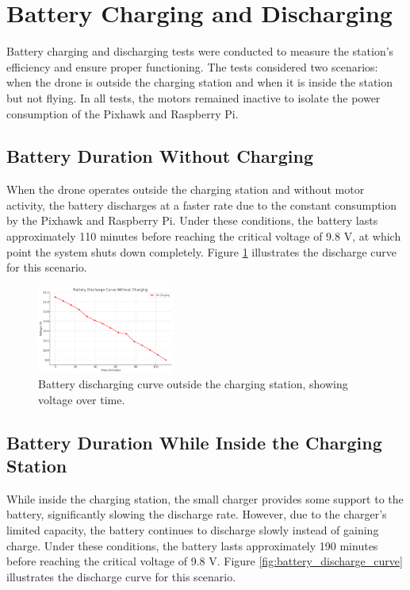 \section{Battery Charging and Discharging}

Battery charging and discharging tests were conducted to measure the station's efficiency and ensure proper functioning. The tests considered two scenarios: when the drone is outside the charging station and when it is inside the station but not flying. In all tests, the motors remained inactive to isolate the power consumption of the Pixhawk and Raspberry Pi.

\subsection{Battery Duration Without Charging}

When the drone operates outside the charging station and without motor activity, the battery discharges at a faster rate due to the constant consumption by the Pixhawk and Raspberry Pi. Under these conditions, the battery lasts approximately 110 minutes before reaching the critical voltage of 9.8 V, at which point the system shuts down completely. Figure \ref{fig:battery_charging_curve} illustrates the discharge curve for this scenario.

\begin{figure}[H]
    \centering
    \includegraphics[width=0.4\textwidth]{pictures/Battery_Discharge_Outside.png}
    \caption{Battery discharging curve outside the charging station, showing voltage over time.}
    \label{fig:battery_charging_curve}
\end{figure}

\subsection{Battery Duration While Inside the Charging Station}

While inside the charging station, the small charger provides some support to the battery, significantly slowing the discharge rate. However, due to the charger’s limited capacity, the battery continues to discharge slowly instead of gaining charge. Under these conditions, the battery lasts approximately 190 minutes before reaching the critical voltage of 9.8 V. Figure \ref{fig:battery_discharge_curve} illustrates the discharge curve for this scenario.

